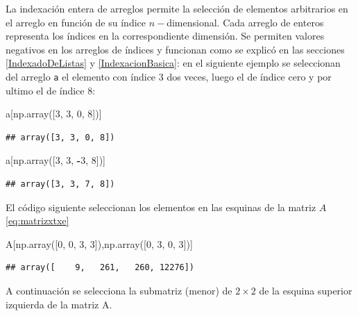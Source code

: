 \documentclass[
]{book}
\newenvironment{Shaded}{\begin{snugshade}}{\end{snugshade}}
\newcommand{\DecValTok}[1]{\textcolor[rgb]{0.00,0.00,0.81}{#1}}
\newcommand{\NormalTok}[1]{#1}
\newcommand{\OperatorTok}[1]{\textcolor[rgb]{0.81,0.36,0.00}{\textbf{#1}}}
\theoremstyle{definition}
\theoremstyle{definition}
\theoremstyle{definition}
\theoremstyle{definition}
\theoremstyle{remark}
\begin{document}
La indexación entera de arreglos permite la selección de elementos arbitrarios en el arreglo en función de su índice \(n-\)dimensional. Cada arreglo de enteros representa los índices en la correspondiente dimensión. Se permiten valores negativos en los arreglos de índices y funcionan como se explicó en las secciones \ref{IndexadoDeListas} y \ref{IndexacionBasica}: en el siguiente ejemplo se seleccionan del arreglo \texttt{a} el elemento con índice 3 dos veces, luego el de índice cero y por ultimo el de índice 8:

\begin{Shaded}
\begin{Highlighting}[]
\NormalTok{a[np.array([}\DecValTok{3}\NormalTok{, }\DecValTok{3}\NormalTok{, }\DecValTok{0}\NormalTok{, }\DecValTok{8}\NormalTok{])] }
\end{Highlighting}
\end{Shaded}

\begin{verbatim}
## array([3, 3, 0, 8])
\end{verbatim}

\begin{Shaded}
\begin{Highlighting}[]
\NormalTok{a[np.array([}\DecValTok{3}\NormalTok{, }\DecValTok{3}\NormalTok{, }\OperatorTok{{-}}\DecValTok{3}\NormalTok{, }\DecValTok{8}\NormalTok{])]}
\end{Highlighting}
\end{Shaded}

\begin{verbatim}
## array([3, 3, 7, 8])
\end{verbatim}

El código siguiente seleccionan los elementos en las esquinas de la matriz \(A\) \eqref{eq:matrizxtxe}

\begin{Shaded}
\begin{Highlighting}[]
\NormalTok{A[np.array([}\DecValTok{0}\NormalTok{, }\DecValTok{0}\NormalTok{, }\DecValTok{3}\NormalTok{, }\DecValTok{3}\NormalTok{]),np.array([}\DecValTok{0}\NormalTok{, }\DecValTok{3}\NormalTok{, }\DecValTok{0}\NormalTok{, }\DecValTok{3}\NormalTok{])]}
\end{Highlighting}
\end{Shaded}

\begin{verbatim}
## array([    9,   261,   260, 12276])
\end{verbatim}

A continuación se selecciona la submatriz (menor) de \(2\times2\) de la esquina superior izquierda de la matriz A.
\end{document}
